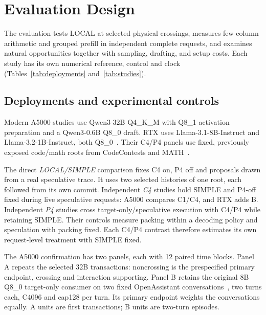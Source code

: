 \section{Evaluation Design}
\label{sec:design}

The evaluation tests LOCAL at selected physical crossings, measures few-column arithmetic and grouped prefill in independent complete requests, and examines natural opportunities together with sampling, drafting, and setup costs. Each study has its own numerical reference, control and clock (Tables~\ref{tab:deployments} and~\ref{tab:studies}).

\subsection{Deployments and experimental controls}
Modern A5000 studies use Qwen3-32B Q4\_K\_M with Q8\_1 activation preparation and a Qwen3-0.6B Q8\_0 draft. RTX uses Llama-3.1-8B-Instruct and Llama-3.2-1B-Instruct, both Q8\_0~\cite{qwen3,llama3,llama32}. Their C4/P4 panels use fixed, previously exposed code/math roots from CodeContests and MATH~\cite{codecontests,math}.


The direct \emph{LOCAL/SIMPLE} comparison fixes C4 on, P4 off and proposals drawn from a real speculative trace. It uses two selected histories of one root, each followed from its own commit. Independent \emph{C4} studies hold SIMPLE and P4-off fixed during live speculative requests: A5000 compares C1/C4, and RTX adds B. Independent \emph{P4} studies cross target-only/speculative execution with C4/P4 while retaining SIMPLE. Their controls measure packing within a decoding policy and speculation with packing fixed. Each C4/P4 contrast therefore estimates its own request-level treatment with SIMPLE fixed.

The A5000 confirmation has two panels, each with 12 paired time blocks. Panel A repeats the selected 32B transactions: noncrossing is the prespecified primary endpoint, crossing and interaction supporting. Panel B retains the original 8B Q8\_0 target-only consumer on two fixed OpenAssistant conversations~\cite{oasst}, two turns each, C4096 and cap128 per turn. Its primary endpoint weights the conversations equally. A units are first transactions; B units are two-turn episodes.

